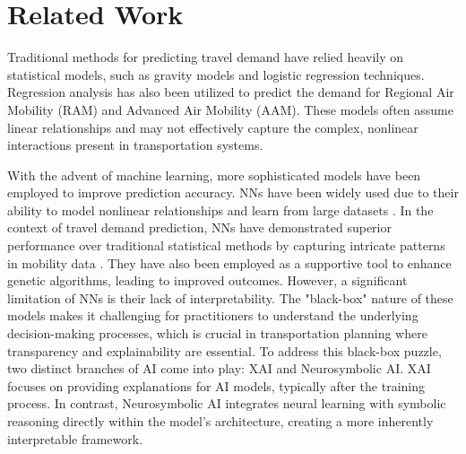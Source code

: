 \section{Related Work}
\label{sec:related_work}

Traditional methods for predicting travel demand have relied heavily on statistical models, such as gravity models\cite{jung2008gravity} and logistic regression techniques\cite{wei2015logistic}. Regression analysis has also been utilized to predict the demand for Regional Air Mobility (RAM)\cite{acharya2025regional} and Advanced Air Mobility (AAM)\cite{10825121}. These models often assume linear relationships and may not effectively capture the complex, nonlinear interactions present in transportation systems.

With the advent of machine learning, more sophisticated models have been employed to improve prediction accuracy. NNs have been widely used due to their ability to model nonlinear relationships and learn from large datasets \cite{guo2020residual}. In the context of travel demand prediction, NNs have demonstrated superior performance over traditional statistical methods by capturing intricate patterns in mobility data \cite{rajendran2021predicting}. They have also been employed as a supportive tool to enhance genetic algorithms, leading to improved outcomes\cite{acharya2024improving}. However, a significant limitation of NNs is their lack of interpretability. The "black-box" nature of these models makes it challenging for practitioners to understand the underlying decision-making processes, which is crucial in transportation planning where transparency and explainability are essential\cite{golshani2018modeling}. To address this black-box puzzle, two distinct branches of AI come into play: XAI\cite{arrieta2020explainable} and Neurosymbolic AI\cite{garcez2023neurosymbolic}. XAI focuses on providing explanations for AI models, typically after the training process. In contrast, Neurosymbolic AI integrates neural learning with symbolic reasoning directly within the model's architecture, creating a more inherently interpretable framework.


